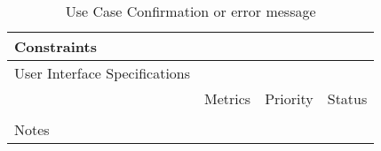 \begin{table}[H]
\begin{tabularx}{\linewidth}{|l|X|X|X|}
    \hline Constraints                   & \multicolumn{3}{l|}{}                                                                                 \\

    \hline User Interface Specifications & \multicolumn{3}{l|}{}                                                                                 \\

    \hline \multirow{2}{*}{}             & Metrics                                                                           & Priority & Status \\
    \cline{2-4}                          &                                                                                   &          &        \\
    \hline Notes                         & \multicolumn{3}{l|}{}                                                                                 \\
    \hline
  \end{tabularx}
  \caption{Use Case Confirmation or error message}
  \label{tab:use_case_confirmation_or_error_message}
\end{table}

